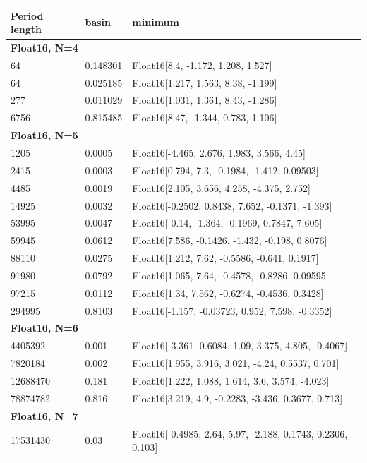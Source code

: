 \begin{table}[htbp]
	\center
	\footnotesize
	\begin{tabular}{l | l | l}
	\textbf{Period length} & \textbf{basin} & \textbf{minimum} \\
	\hline
	\multicolumn{3}{l}{\textbf{Float16, N=4}}  \\
64 & 0.148301 & Float16[8.4, -1.172, 1.208, 1.527] \\
64 & 0.025185 & Float16[1.217, 1.563, 8.38, -1.199] \\
277 & 0.011029 & Float16[1.031, 1.361, 8.43, -1.286] \\
6756 & 0.815485 & Float16[8.47, -1.344, 0.783, 1.106] \\
	\multicolumn{3}{l}{\textbf{Float16, N=5}}  \\
1205 & 0.0005 & Float16[-4.465, 2.676, 1.983, 3.566, 4.45] \\
2415 & 0.0003 & Float16[0.794, 7.3, -0.1984, -1.412, 0.09503] \\
4485 & 0.0019 & Float16[2.105, 3.656, 4.258, -4.375, 2.752] \\
14925 & 0.0032 & Float16[-0.2502, 0.8438, 7.652, -0.1371, -1.393] \\
53995 & 0.0047 & Float16[-0.14, -1.364, -0.1969, 0.7847, 7.605] \\
59945 & 0.0612 & Float16[7.586, -0.1426, -1.432, -0.198, 0.8076] \\
88110 & 0.0275 & Float16[1.212, 7.62, -0.5586, -0.641, 0.1917] \\
91980 & 0.0792 & Float16[1.065, 7.64, -0.4578, -0.8286, 0.09595] \\
97215 & 0.0112 & Float16[1.34, 7.562, -0.6274, -0.4536, 0.3428] \\
294995 & 0.8103 & Float16[-1.157, -0.03723, 0.952, 7.598, -0.3352] \\
	\multicolumn{3}{l}{\textbf{Float16, N=6}}  \\
4405392 & 0.001 & Float16[-3.361, 0.6084, 1.09, 3.375, 4.805, -0.4067] \\
7820184 & 0.002 & Float16[1.955, 3.916, 3.021, -4.24, 0.5537, 0.701] \\
12688470 & 0.181 & Float16[1.222, 1.088, 1.614, 3.6, 3.574, -4.023] \\
78874782 & 0.816 & Float16[3.219, 4.9, -0.2283, -3.436, 0.3677, 0.713] \\
	\multicolumn{3}{l}{\textbf{Float16, N=7}}  \\
17531430 & 0.03 & Float16[-0.4985, 2.64, 5.97, -2.188, 0.1743, 0.2306, 0.103] \\

\end{tabular}
\end{table}
